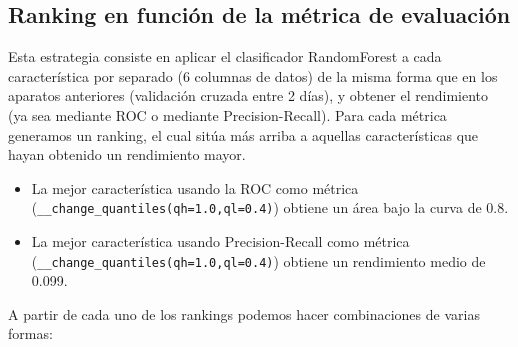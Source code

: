 \documentclass[a4paper,12pt,twoside,oldfontcommands]{memoir}
\begin{document}
	\subsection{Ranking en función de la métrica de evaluación}
	Esta estrategia consiste en aplicar el clasificador RandomForest a cada característica por separado (6 columnas de datos) de la misma forma que en los aparatos anteriores (validación cruzada entre 2 días), y obtener el rendimiento (ya sea mediante ROC o mediante Precision-Recall). Para cada métrica generamos un ranking, el cual sitúa más arriba a aquellas características que hayan obtenido un rendimiento mayor. 
	
	\begin{itemize}
		\item La mejor característica usando la ROC como métrica (\texttt{\_\_change\_quantiles(qh=1.0,ql=0.4)}) obtiene un área bajo la curva de 0.8. 
		\item La mejor característica usando Precision-Recall como métrica (\texttt{\_\_change\_quantiles(qh=1.0,ql=0.4)}) obtiene un rendimiento medio de 0.099. 
	\end{itemize}
	
	A partir de cada uno de los rankings podemos hacer combinaciones de varias formas: 
	
\end{document}
